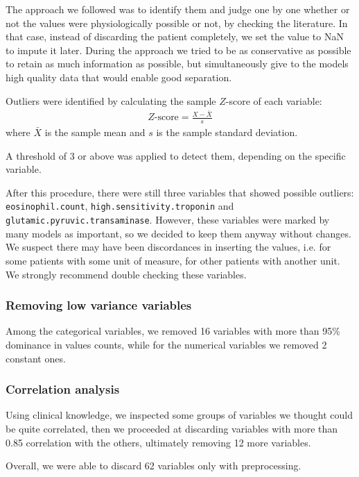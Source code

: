 The approach we followed was to identify them and judge one by one whether or not the values were physiologically possible or not, by checking the literature. In that case, instead of discarding the patient completely, we set the value to NaN to impute it later. During the approach we tried to be as conservative as possible to retain as much information as possible, but simultaneously give to the models high quality data that would enable good separation.

Outliers were identified by calculating the sample $Z$-score of each variable:
\begin{align*}
    Z\text{-score} = \frac{X-\bar{X}}{s}
\end{align*}
where $\bar{X}$ is the sample mean and $s$ is the sample standard deviation.

A threshold of 3 or above was applied to detect them, depending on the specific variable.

After this procedure, there were still three variables that showed possible outliers: \texttt{eosinophil.count}, \texttt{high.sensitivity.troponin} and \texttt{glutamic.pyruvic.transaminase}. However, these variables were marked by many models as important, so we decided to keep them anyway without changes. We suspect there may have been discordances in inserting the values, i.e. for some patients with some unit of measure, for other patients with another unit. We strongly recommend double checking these variables.

\subsubsection{Removing low variance variables}

Among the categorical variables, we removed 16 variables with more than 95\% dominance in values counts, while for the numerical variables we removed 2 constant ones.

\subsubsection{Correlation analysis}

Using clinical knowledge, we inspected some groups of variables we thought could be quite correlated, then we proceeded at discarding variables with more than 0.85 correlation with the others, ultimately removing 12 more variables.

Overall, we were able to discard 62 variables only with preprocessing.

